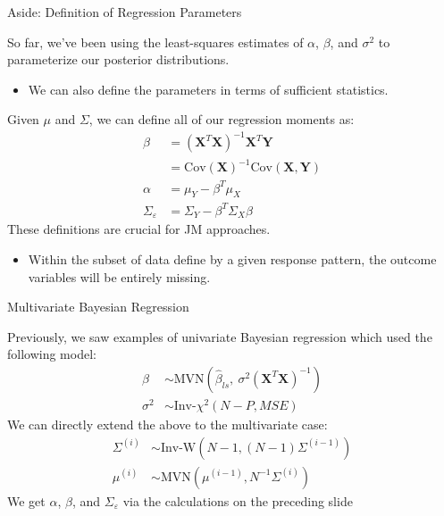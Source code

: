 \documentclass[10pt]{beamer}\usepackage[]{graphicx}\usepackage[]{color}
\begin{document}



\begin{frame}{Aside: Definition of Regression Parameters}
  
  So far, we've been using the least-squares estimates of $\alpha$, $\beta$, and 
  $\sigma^2$ to parameterize our posterior distributions.
  \vc
  \begin{itemize}
  \item We can also define the parameters in terms of sufficient statistics.
  \end{itemize}
  \vb
  Given $\mu$ and $\Sigma$, we can define all of our regression moments as:
  \begin{align*}
    \beta &= (\mathbf{X}^T \mathbf{X})^{-1} \mathbf{X}^T \mathbf{Y}\\
    &= \text{Cov}(\mathbf{X})^{-1} \text{Cov}(\mathbf{X}, \mathbf{Y})\\
    \alpha &= \mu_Y - \beta^T \mu_X\\
    \Sigma_{\varepsilon} &= \Sigma_Y - \beta^T \Sigma_X \beta
  \end{align*}
  These definitions are crucial for JM approaches.
  \begin{itemize}
  \item Within the subset of data define by a given response pattern, the 
    outcome variables will be entirely missing.
  \end{itemize}
  
\end{frame}


\begin{frame}{Multivariate Bayesian Regression}
  
  Previously, we saw examples of univariate Bayesian regression which used the 
  following model:
  \begin{align*}
    \beta &\sim \text{MVN} \left( \hat{\beta}_{ls}, ~ 
    \sigma^2 (\mathbf{X}^T \mathbf{X})^{-1} \right)\\
    \sigma^2 &\sim \text{Inv-}\chi^2 \left(N - P, MSE \right)
  \end{align*}
  We can directly extend the above to the multivariate case:
  \begin{align*}
    \Sigma^{(i)} &\sim \text{Inv-W} \left(N - 1, (N - 1) \Sigma^{(i - 1)} \right)\\
    \mu^{(i)} &\sim \text{MVN} \left(\mu^{(i - 1)}, N^{-1}\Sigma^{(i)} \right)
  \end{align*}
  We get $\alpha$, $\beta$, and $\Sigma_{\varepsilon}$ via the calculations on the 
  preceding slide
\end{frame}
\end{document}
